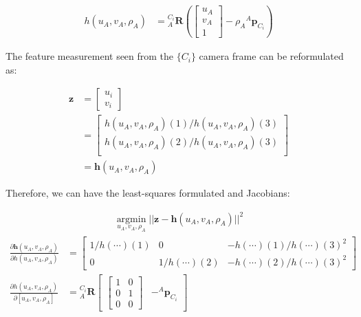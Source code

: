 \begin{align*} h(u_A, v_A, \rho_A) & = {}^{C_i}_A\mathbf{R} \left( \begin{bmatrix} u_A \\ v_A \\ 1 \end{bmatrix} - \rho_A {}^A\mathbf{p}_{C_i} \right) \end{align*}

The feature measurement seen from the $\{C_i\}$ camera frame can be reformulated as\+:

\begin{align*} \mathbf{z} & = \begin{bmatrix} u_i \\ v_i \end{bmatrix} \\ &= \begin{bmatrix} h(u_A, v_A, \rho_A)(1) / h(u_A, v_A, \rho_A)(3) \\ h(u_A, v_A, \rho_A)(2) / h(u_A, v_A, \rho_A)(3) \\ \end{bmatrix} \\ & = \mathbf{h}(u_A, v_A, \rho_A) \end{align*}

Therefore, we can have the least-\/squares formulated and Jacobians\+:

\begin{align*} \operatorname*{argmin}_{u_A, v_A, \rho_A}||{\mathbf{z} - \mathbf{h}(u_A, v_A, \rho_A)}||^2 \end{align*} \begin{align*} \frac{\partial \mathbf{h}(u_A, v_A, \rho_A)}{\partial {h}(u_A, v_A, \rho_A)} & = \begin{bmatrix} 1/h(\cdots)(1) & 0 & -h(\cdots)(1)/h(\cdots)(3)^2 \\ 0 & 1/h(\cdots)(2) & -h(\cdots)(2)/h(\cdots)(3)^2 \end{bmatrix} \\ \frac{\partial {h}(u_A, v_A, \rho_A)}{\partial [u_A, v_A, \rho_A]} & = {}^{C_i}_A\mathbf{R} \begin{bmatrix} \begin{bmatrix} 1 & 0 \\ 0 & 1 \\ 0 & 0 \end{bmatrix} & -{}^A\mathbf{p}_{C_i} \end{bmatrix} \end{align*}

